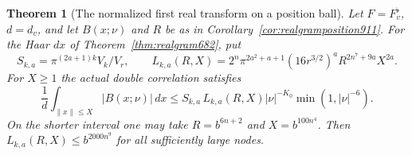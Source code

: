 \documentclass[a4paper,11pt]{article}
\newtheorem{theorem}[proposition]{Theorem}
\theoremstyle{definition}
\theoremstyle{remark}
\numberwithin{equation}{section}
\begin{document}
\begin{theorem}[The normalized first real transform on a position ball]
\leavevmode\label{thm:realpositionball912}
Let \(F=F_v^\flat\), \(d=d_v\), and let \(B(x;\nu)\) and \(R\)
be as in Corollary~\ref{cor:realgramposition911}.
For the Haar \(dx\) of Theorem~\ref{thm:realgram682}, put
\[
 S_{k,a}=\pi^{(2a+1)k} V_k/V_r,\qquad
 L_{k,a}(R,X)=2^n\pi^{2a^2+a+1}
        (16r^{3/2})^a R^{2n^7+9a}X^{2a}.
\]
For \(X\ge1\) the actual double correlation satisfies
\begin{equation}
 \frac1d\int_{\|x\|\le X}|B(x;\nu)|\,dx
 \le S_{k,a}\, L_{k,a}(R,X)
              |\nu|^{-K_0}\min(1,|\nu|^{-6}).
 \label{eq:realpositionball912}
\end{equation}
On the shorter interval one may take \(R=b^{6n+2}\)
and \(X=b^{100n^4}\). Then \(L_{k,a}(R,X)\le b^{2000n^9}\)
for all sufficiently large nodes.
\end{theorem}
\end{document}
